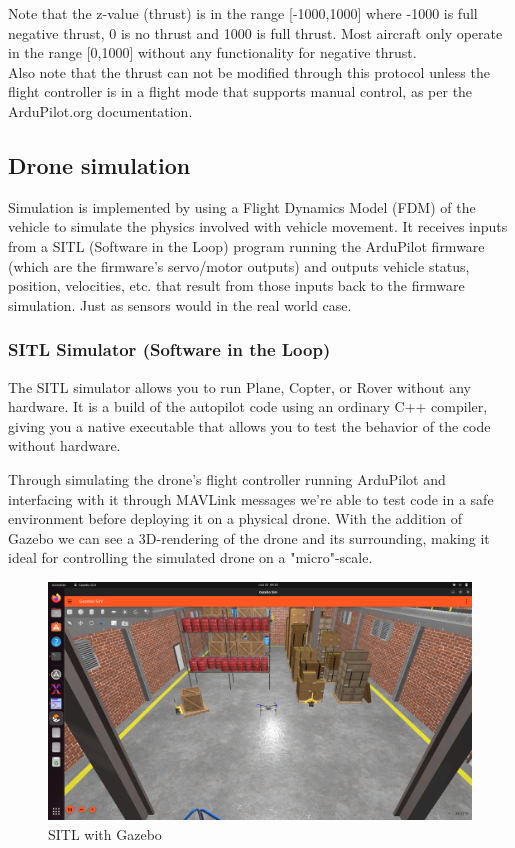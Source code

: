 Note that the z-value (thrust) is in the range [-1000,1000] where -1000 is full negative thrust, 0 is no thrust and 1000 is full thrust. Most aircraft only operate in the range [0,1000] without any functionality for negative thrust. \\
Also note that the thrust can not be modified through this protocol unless the flight controller is in a flight mode that supports manual control, as per the ArduPilot.org\cite{documentation-ArduPilot} documentation.




\subsection{Drone simulation}
\label{drone_sim}
Simulation is implemented by using a Flight Dynamics Model (FDM) of the vehicle to simulate the physics involved with vehicle movement. It receives inputs from a SITL (Software in the Loop) program running the ArduPilot firmware (which are the firmware’s servo/motor outputs) and outputs vehicle status, position, velocities, etc. that result from those inputs back to the firmware simulation. Just as sensors would in the real world case. \cite{documentation-ArduPilot}

\subsubsection{SITL Simulator (Software in the Loop)}
The SITL simulator allows you to run Plane, Copter, or Rover without any hardware. It is a build of the autopilot code using an ordinary C++ compiler, giving you a native executable that allows you to test the behavior of the code without hardware. \cite{documentation-ArduPilot}

Through simulating the drone's flight controller running ArduPilot and interfacing with it through MAVLink messages we're able to test code in a safe environment before deploying it on a physical drone. With the addition of Gazebo \cite{Gazebo} we can see a 3D-rendering of the drone and its surrounding, making it ideal for controlling the simulated drone on a "micro"-scale.

\begin{figure}[!htb]
    \centering
    \includegraphics[width=\textwidth]{fig/sitl-gazebo.png}
    \caption{SITL with Gazebo}
\end{figure}

